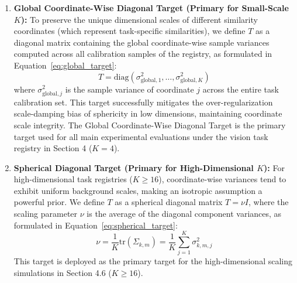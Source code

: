 \begin{enumerate}
    \item {\bf Global Coordinate-Wise Diagonal Target (Primary for Small-Scale $K$):} To preserve the unique dimensional scales of different similarity coordinates (which represent task-specific similarities), we define $T$ as a diagonal matrix containing the global coordinate-wise sample variances computed across all calibration samples of the registry, as formulated in Equation~\ref{eq:global_target}:
    \begin{equation}
    \label{eq:global_target}
        T = \text{diag}(\sigma^2_{\text{global}, 1}, \dots, \sigma^2_{\text{global}, K})
    \end{equation}
    where $\sigma^2_{\text{global}, j}$ is the sample variance of coordinate $j$ across the entire task calibration set. This target successfully mitigates the over-regularization scale-damping bias of sphericity in low dimensions, maintaining coordinate scale integrity. The Global Coordinate-Wise Diagonal Target is the primary target used for all main experimental evaluations under the vision task registry in Section 4 ($K=4$).
    \item {\bf Spherical Diagonal Target (Primary for High-Dimensional $K$):} For high-dimensional task registries ($K \ge 16$), coordinate-wise variances tend to exhibit uniform background scales, making an isotropic assumption a powerful prior. We define $T$ as a spherical diagonal matrix $T = \nu I$, where the scaling parameter $\nu$ is the average of the diagonal component variances, as formulated in Equation~\ref{eq:spherical_target}:
    \begin{equation}
    \label{eq:spherical_target}
        \nu = \frac{1}{K} \text{tr}(\Sigma_{k, m}) = \frac{1}{K} \sum_{j=1}^K \sigma^2_{k, m, j}
    \end{equation}
    This target is deployed as the primary target for the high-dimensional scaling simulations in Section 4.6 ($K \ge 16$).
\end{enumerate}

